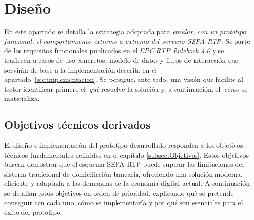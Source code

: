\section{Diseño}
\label{sec:diseno}

En este apartado se detalla la estrategia adoptada para \emph{emular, con un prototipo funcional, el comportamiento extremo‑a‑extremo del servicio SEPA RTP}. Se parte de los requisitos funcionales publicados en el \emph{EPC RTP Rulebook 4.0} y se traducen a casos de uso concretos, modelo de datos y flujos de interacción que servirán de base a la implementación descrita en el apartado~\ref{sec:implementacion}. Se persigue, ante todo, una visión que facilite al lector identificar primero el~\emph{qué} resuelve la solución y, a continuación, el~\emph{cómo} se materializa.

\subsection{Objetivos técnicos derivados}
\label{subsec:diseno_objetivos}


El diseño e implementación del prototipo desarrollado responden a los objetivos técnicos fundamentales definidos en el capítulo \ref{subsec:Objetivos}. Estos objetivos buscan demostrar que el esquema SEPA RTP puede superar las limitaciones del sistema tradicional de domiciliación bancaria, ofreciendo una solución moderna, eficiente y adaptada a las demandas de la economía digital actual. A continuación se detallan estos objetivos en orden de prioridad, explicando qué se pretende conseguir con cada uno, cómo se implementaría y por qué son esenciales para el éxito del prototipo.

